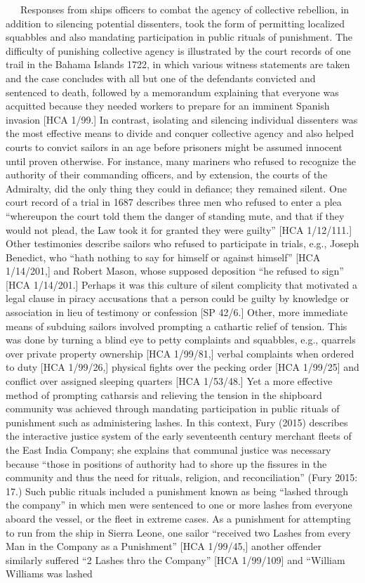 \documentclass[12pt]{article}
\newenvironment{styleStandard}{\renewcommand\baselinestretch{1.0}\setlength\leftskip{0cm}\setlength\rightskip{0cm plus 1fil}\setlength\parindent{0cm}\setlength\parfillskip{0pt plus 1fil}\setlength\parskip{0in plus 1pt}\writerlistparindent\writerlistleftskip\leavevmode\normalfont\normalsize\writerlistlabel\ignorespaces}{\unskip\vspace{0in plus 1pt}\par}
\newcommand\writerlistleftskip{}
\newcommand\writerlistparindent{}
\newcommand\writerlistlabel{}
\begin{document}
\begin{styleStandard}
\ \ \ Responses from ships officers to combat the agency of collective rebellion, in addition to silencing potential dissenters, took the form of permitting localized squabbles and also mandating participation in public rituals of punishment. The difficulty of punishing collective agency is illustrated by the court records of one trail in the Bahama Islands 1722, in which various witness statements are taken and the case concludes with all but one of the defendants convicted and sentenced to death, followed by a memorandum explaining that everyone was acquitted because they needed workers to prepare for an imminent Spanish invasion [HCA 1/99.] In contrast, isolating and silencing individual dissenters was the most effective means to divide and conquer collective agency and also helped courts to convict sailors in an age before prisoners might be assumed innocent until proven otherwise. For instance, many mariners who refused to recognize the authority of their commanding officers, and by extension, the courts of the Admiralty, did the only thing they could in defiance; they remained silent. One court record of a trial in 1687 describes three men who refused to enter a plea “whereupon the court told them the danger of standing mute, and that if they would not plead, the Law took it for granted they were guilty” [HCA 1/12/111.] Other testimonies describe sailors who refused to participate in trials, e.g., Joseph Benedict, who “hath nothing to say for himself or against himself” [HCA 1/14/201,] and Robert Mason, whose supposed deposition “he refused to sign” [HCA 1/14/201.] Perhaps it was this culture of silent complicity that motivated a legal clause in piracy accusations that a person could be guilty by knowledge or association in lieu of testimony or confession [SP 42/6.] Other, more immediate means of subduing sailors involved prompting a cathartic relief of tension. This was done by turning a blind eye to petty complaints and squabbles, e.g., quarrels over private property ownership [HCA 1/99/81,] verbal complaints when ordered to duty [HCA 1/99/26,] physical fights over the pecking order [HCA 1/99/25] and conflict over assigned sleeping quarters [HCA 1/53/48.] Yet a more effective method of prompting catharsis and relieving the tension in the shipboard community was achieved through mandating participation in public rituals of punishment such as administering lashes. In this context, Fury (2015) describes the interactive justice system of the early seventeenth century merchant fleets of the East India Company; she explains that communal justice was necessary because “those in positions of authority had to shore up the fissures in the community and thus the need for rituals, religion, and reconciliation” (Fury 2015: 17.) Such public rituals included a punishment known as being “lashed through the company” in which men were sentenced to one or more lashes from everyone aboard the vessel, or the fleet in extreme cases. As a punishment for attempting to run from the ship in Sierra Leone, one sailor “received two Lashes from every Man in the Company as a Punishment” [HCA 1/99/45,] another offender similarly suffered “2 Lashes thro the Company” [HCA 1/99/109] and “William Williams was lashed 
\end{styleStandard}
\end{document}
